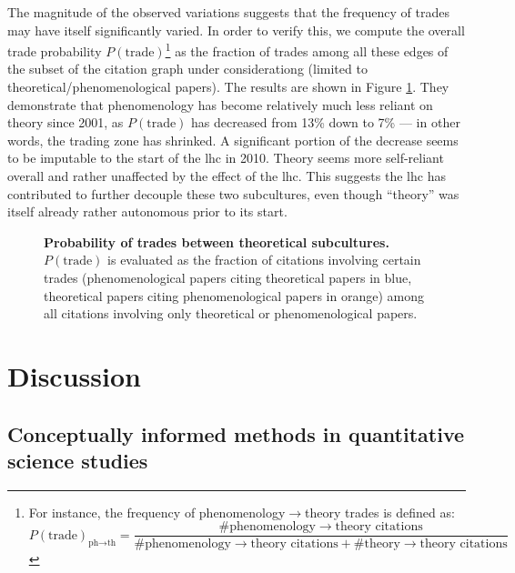 \documentclass[smallextended]{svjour3}
\begin{document}
The magnitude of the observed variations suggests that the frequency of trades may have itself significantly varied. In order to verify this, we compute the overall trade probability $P(\text{trade})$\footnote{For instance, the frequency of phenomenology$\to$theory trades is defined as: \begin{equation}
    P(\text{trade})_{\text{ph}\to\text{th}} = \dfrac{\# \text{phenomenology}\to\text{theory citations}}{\# \text{phenomenology}\to\text{theory citations}  + \# \text{theory}\to\text{theory citations} }
\end{equation}} as the fraction of trades among all these edges of the subset of the citation graph under considerationg (limited to theoretical/phenomenological papers). The results are shown in Figure \ref{fig:cross_dynamics}. They demonstrate that phenomenology has become relatively much less reliant on theory since 2001, as $P(\text{trade})$ has decreased from 13\% down to 7\% --- in other words, the trading zone has shrinked. A significant portion of the decrease seems to be imputable to the start of the \gls{lhc} in 2010. Theory seems more self-reliant overall and rather unaffected by the effect of the \gls{lhc}. This suggests the \gls{lhc} has contributed to further decouple these two subcultures, even though ``theory'' was itself already rather autonomous prior to its start.

\begin{figure}
    \centering
    
    \caption{\textbf{Probability of trades between theoretical subcultures.} $P(\text{trade})$ is evaluated as the fraction of citations involving certain trades (phenomenological papers citing theoretical papers in blue, theoretical papers citing phenomenological papers in orange) among all citations involving only theoretical or phenomenological papers.} 
    \label{fig:cross_dynamics}
\end{figure}


\section{\label{section:discussion}Discussion}

\subsection{Conceptually informed methods in quantitative science studies}
\end{document}
